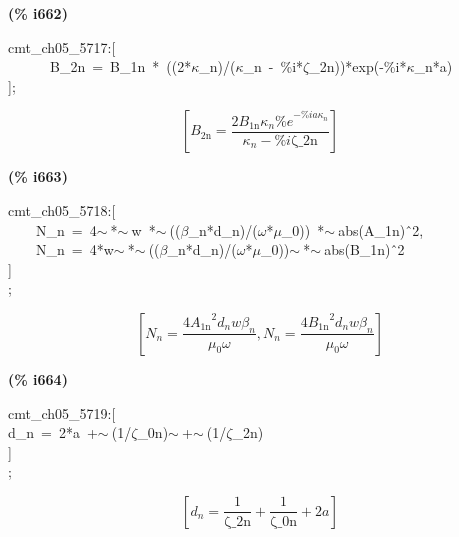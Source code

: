 \documentclass[fleqn]{article}
\begin{document}
\noindent
\begin{minipage}[t]{4.000000em}\color{red}\bfseries
(\% i662)	
\end{minipage}
\begin{minipage}[t]{\textwidth}\color{blue}
cmt\_ch05\_5717:[\\
\ \ \ \ \ \ B\_2n\ =\ B\_1n\ *\ ((2*\ensuremath{\kappa}\_n)/(\ensuremath{\kappa}\_n\ -\ \%i*\ensuremath{\zeta}\_2n))*exp(-\%i*\ensuremath{\kappa}\_n*a)\\
];
\end{minipage}
\[\displaystyle \tag{\% o662} 
\left[ {B_{\ensuremath{\mathrm{2n}}}}=\frac{2 {B_{\ensuremath{\mathrm{1n}}}} {{\kappa }_n} {{\% e}^{-\% i a {{\kappa }_n}}}}{{{\kappa }_n}-\% i \ensuremath{\mathrm{\zeta \_ 2n}}}\right] \mbox{}
\]


\noindent
\begin{minipage}[t]{4.000000em}\color{red}\bfseries
(\% i663)	
\end{minipage}
\begin{minipage}[t]{\textwidth}\color{blue}
cmt\_ch05\_5718:[\\
\ \ \ \ N\_n\ =\ 4\ensuremath{\sim\ }*\ensuremath{\sim\ }w\ *\ensuremath{\sim\ }((\ensuremath{\beta}\_n*d\_n)/(\ensuremath{\omega}*\ensuremath{\mu}\_0))\ *\ensuremath{\sim\ }abs(A\_1n)\^\ 2,\\
\ \ \ \ N\_n\ =\ 4*w\ensuremath{\sim\ }*\ensuremath{\sim\ }((\ensuremath{\beta}\_n*d\_n)/(\ensuremath{\omega}*\ensuremath{\mu}\_0))\ensuremath{\sim\ }*\ensuremath{\sim\ }abs(B\_1n)\^\ 2\\
]\\
;
\end{minipage}
\[\displaystyle \tag{\% o663} 
\left[ {N_n}=\frac{4 {{{A_{\ensuremath{\mathrm{1n}}}}}^{2}} {d_n} w {{\beta }_n}}{{{\mu }_0} \omega }\operatorname{,}{N_n}=\frac{4 {{{B_{\ensuremath{\mathrm{1n}}}}}^{2}} {d_n} w {{\beta }_n}}{{{\mu }_0} \omega }\right] \mbox{}
\]


\noindent
\begin{minipage}[t]{4.000000em}\color{red}\bfseries
(\% i664)	
\end{minipage}
\begin{minipage}[t]{\textwidth}\color{blue}
cmt\_ch05\_5719:[\\
d\_n\ =\ 2*a\ +\ensuremath{\sim\ }(1/\ensuremath{\zeta}\_0n)\ensuremath{\sim\ }+\ensuremath{\sim\ }(1/\ensuremath{\zeta}\_2n)\\
]\\
;
\end{minipage}
\[\displaystyle \tag{\% o664} 
\left[ {d_n}=\frac{1}{\ensuremath{\mathrm{\zeta \_ 2n}}}+\frac{1}{\ensuremath{\mathrm{\zeta \_ 0n}}}+2 a\right] \mbox{}
\]
\end{document}

